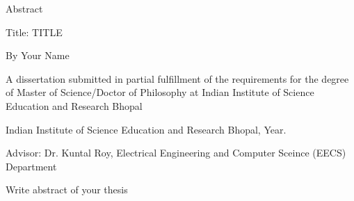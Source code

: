 \vspace*{0.5mm}
\begin{center}
\large{Abstract}
\end{center}

\vspace*{1cm}
\begin{flushleft}
Title: TITLE
\end{flushleft}

\begin{flushleft}
By Your Name
\end{flushleft}

\begin{flushleft}
A dissertation submitted in partial fulfillment of the requirements for the degree of Master of Science/Doctor of Philosophy at Indian Institute of Science Education and Research Bhopal 
\end{flushleft}

\begin{center}
Indian Institute of Science Education and Research Bhopal, Year.
\end{center}

\begin{center}
Advisor: Dr. Kuntal Roy, Electrical Engineering and Computer Sceince (EECS) Department
\end{center}

\vspace*{1cm}
\doublespacing
Write abstract of your thesis
